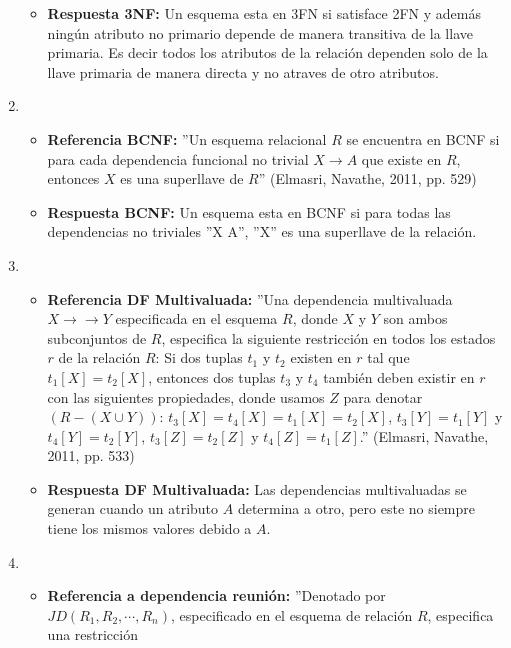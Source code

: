 \documentclass[twoside]{article}
\begin{document}
\begin{enumerate}
\begin{itemize}
                  \item \textbf{Respuesta 3NF:} Un esquema esta en 3FN si satisface 2FN y además ningún atributo no primario depende de manera transitiva de la llave primaria. Es decir todos
                        los atributos de la relaci\'on dependen solo de la llave primaria de manera directa y no atraves de otro atributos.
            \end{itemize}
      \item
            \begin{itemize}
                  \item \textbf{Referencia BCNF:} ''Un esquema relacional $R$ se encuentra en BCNF si para cada dependencia funcional no trivial $X \rightarrow A$ que existe en $R$,
                        entonces $X$ es una superllave de $R$'' (Elmasri, Navathe, 2011, pp. 529)
                  \item \textbf{Respuesta BCNF:} Un esquema esta en BCNF si para todas las dependencias no triviales ''X \rightarrow A'', ''X'' es una superllave de la relación.
            \end{itemize}
      \item
            \begin{itemize}
                  \item \textbf{Referencia DF Multivaluada:} ''Una dependencia multivaluada $X \rightarrow \rightarrow Y$ especificada en el esquema $R$, donde $X$ y $Y$ son ambos
                        subconjuntos de $R$, especifica la siguiente restricci\'on en todos los estados $r$ de la relaci\'on $R$: Si dos tuplas $t_1$ y $t_2$ existen en $r$ tal que
                        $t_1[X] = t_2[X]$, entonces dos tuplas $t_3$ y $t_4$ tambi\'en deben existir en $r$ con las siguientes propiedades, donde usamos $Z$ para denotar $(R - (X \cup Y))$:
                        $t_3[X] = t_4[X] = t_1[X] = t_2[X]$, $t_3[Y] = t_1[Y]$ y $t_4[Y] = t_2[Y]$, $t_3[Z] = t_2[Z]$ y $t_4[Z] = t_1[Z]$.'' (Elmasri, Navathe, 2011, pp. 533)
                  \item \textbf{Respuesta DF Multivaluada:}  Las dependencias multivaluadas se generan cuando un atributo $A$ determina a otro, pero este no siempre tiene los mismos valores
                        debido a $A$.
            \end{itemize}
      \item
            \begin{itemize}
                  \item \textbf{Referencia a dependencia reuni\'on:} ''Denotado por $JD(R_1, R_2, \cdots, R_n)$, especificado en el esquema de relaci\'on $R$, especifica una restricci\'on

\end{itemize}
\end{enumerate}
\end{document}
